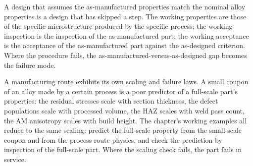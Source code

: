 \begin{principle}
A design that assumes the as-manufactured properties match the
nominal alloy properties is a design that has skipped a step. The
working properties are those of the specific microstructure produced
by the specific process; the working inspection is the inspection of
the as-manufactured part; the working acceptance is the acceptance
of the as-manufactured part against the as-designed criterion. Where
the procedure fails, the as-manufactured-versus-as-designed gap
becomes the failure mode.
\end{principle}

\begin{archetype}
A manufacturing route exhibits its own scaling and failure laws. A
small coupon of an alloy made by a certain process is a poor
predictor of a full-scale part's properties: the residual stresses
scale with section thickness, the defect populations scale with
processed volume, the HAZ scales with weld pass count, the AM
anisotropy scales with build height. The chapter's working examples
all reduce to the same scaling: predict the full-scale property from
the small-scale coupon and from the process-route physics, and check
the prediction by inspection of the full-scale part. Where the
scaling check fails, the part fails in service.
\end{archetype}

